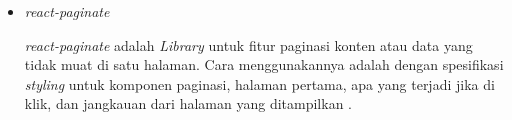 \documentclass[a4paper]{article}
\begin{document}
\begin{enumerate}[label=\alph*. ]
\begin{enumerate}
\begin{itemize}
                        \item \textit{react-paginate}

                        \textit{react-paginate} adalah \textit{Library} untuk fitur paginasi konten atau data yang tidak muat di satu halaman. Cara menggunakannya adalah dengan spesifikasi \textit{styling} untuk komponen paginasi, halaman pertama, apa yang terjadi jika di klik, dan jangkauan dari halaman yang ditampilkan \autocite{react-paginate}.

                    \end{itemize}



          \end{enumerate}

\end{enumerate}
\end{document}
